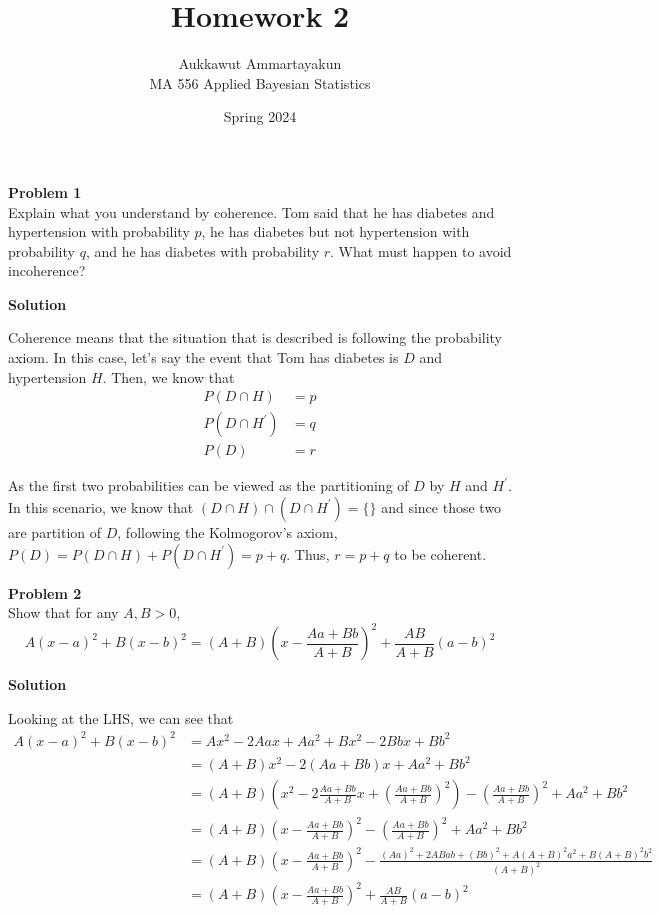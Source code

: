 \documentclass{article}
\title{Homework 2}
\author{Aukkawut Ammartayakun\\MA 556 Applied Bayesian Statistics}
\date{Spring 2024}
\begin{document}
\maketitle
\noindent
\Large{\textbf{Problem 1}}\normalsize
\\


Explain what you understand by coherence. Tom said that he has diabetes and
hypertension with probability $p$, he has diabetes but not hypertension with probability $q$, and he has diabetes with probability $r$. What must happen to avoid incoherence?

\vspace{\baselineskip}
\noindent
\textbf{Solution}

Coherence means that the situation that is described is following the probability axiom. In this case, let's say the event that Tom has diabetes is $D$ and hypertension $H$. Then, we know that
\begin{align*}
    P(D\cap H) &= p\\
    P(D\cap H^{'}) &= q\\
    P(D) &= r
\end{align*}

As the first two probabilities can be viewed as the partitioning of $D$ by $H$ and $H^{'}$. In this scenario, we know that $(D\cap H) \cap (D\cap H^{'}) = \{\}$ and since those two are partition of $D$, following the Kolmogorov's axiom, $P(D) = P(D\cap H) +  P(D\cap H^{'}) = p+q$.
Thus, $r = p + q$ to be coherent.
\vspace{\baselineskip}

\noindent
\Large{\textbf{Problem 2}}\normalsize
\\


Show that for any $A, B > 0$,
\[A(x-a)^2 + B(x-b)^2 = (A+B)\left(x-\frac{Aa+Bb}{A+B}\right)^2 + \frac{AB}{A+B}\left(a-b\right)^2\]

\vspace{\baselineskip}
\noindent
\textbf{Solution}

Looking at the LHS, we can see that
\begin{align*}
    A(x-a)^2 + B(x-b)^2 &= Ax^2 - 2Aax + Aa^2 + Bx^2 - 2Bbx + Bb^2 \\
    &= (A+B)x^2 - 2(Aa+Bb)x + Aa^2 + Bb^2 \\
    &= (A+B)\left(x^2 - 2\frac{Aa+Bb}{A+B} x + \left(\frac{Aa+Bb}{A+B}\right)^2\right) - \left(\frac{Aa+Bb}{A+B}\right)^2 + Aa^2 + Bb^2\\
    &= (A+B)\left(x - \frac{Aa+Bb}{A+B}\right)^2 - \left(\frac{Aa+Bb}{A+B}\right)^2 + Aa^2 + Bb^2\\
    &=  (A+B)\left(x - \frac{Aa+Bb}{A+B}\right)^2 - \frac{(Aa)^2 + 2ABab + (Bb)^2 + A(A+B)^2a^2+ B(A+B)^2b^2}{(A+B)^2} \\
    &=  (A+B)\left(x-\frac{Aa+Bb}{A+B}\right)^2 + \frac{AB}{A+B}\left(a-b\right)^2
\end{align*}
\end{document}
